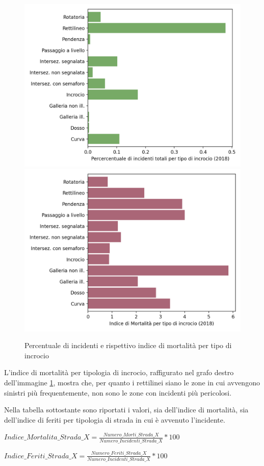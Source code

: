 \documentclass[a4paper]{report}
\begin{document}
\begin{figure}
    \includegraphics[width=0.5\linewidth]{../src/incidenti/incidenti_senza_coords/localizzazione_incidente/intersezioni.png}
    \includegraphics[width=0.5\linewidth]{../src/incidenti/incidenti_senza_coords/localizzazione_incidente/indice_mortalita.png}
    \caption{Percentuale di incidenti e rispettivo indice di mortalità per tipo di incrocio}
    \label{fig:tipo-intersezioni}
\end{figure}

L'indice di mortalità per tipologia di incrocio, raffigurato nel grafo destro 
dell'immagine \ref{fig:tipo-intersezioni}, mostra che, per quanto i rettilinei siano le zone 
in cui avvengono sinistri più frequentemente, non sono le zone con incidenti più pericolosi. 

Nella tabella sottostante sono riportati i valori, sia dell'indice di mortalità, sia dell'indice di 
feriti per tipologia di strada in cui è avvenuto l'incidente.

\begin{center}
    $Indice\_Mortalita\_Strada\_X = \displaystyle \frac{Numero\_Morti\_Strada\_X}{Numero\_Incidenti\_Strada\_X} * 100$ 
\end{center}

\begin{center}
    $Indice\_Feriti\_Strada\_X = \displaystyle \frac{Numero\_Feriti\_Strada\_X}{Numero\_Incidenti\_Strada\_X} * 100$ 
\end{center}
\end{document}
